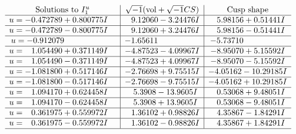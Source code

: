 \documentclass[1p]{elsarticle_modified}
\theoremstyle{definition}
\newcommand{\I}{\sqrt{-1}}
\begin{document}
$$\begin{array}{c|c|c}  
\text{Solutions to }I^u_{1}& \I (\text{vol} + \sqrt{-1}CS) & \text{Cusp shape}\\
 \hline 
\begin{aligned}
u &= -0.472789 + 0.800775 I\end{aligned}
 & \phantom{-}9.12060 - 3.24476 I & \phantom{-}5.98156 + 0.51441 I \\ \hline\begin{aligned}
u &= -0.472789 - 0.800775 I\end{aligned}
 & \phantom{-}9.12060 + 3.24476 I & \phantom{-}5.98156 - 0.51441 I \\ \hline\begin{aligned}
u &= -0.912079\phantom{ +0.000000I}\end{aligned}
 & -1.65611\phantom{ +0.000000I} & -5.73710\phantom{ +0.000000I} \\ \hline\begin{aligned}
u &= \phantom{-}1.054490 + 0.371149 I\end{aligned}
 & -4.87523 - 4.09967 I & -8.95070 + 5.15592 I \\ \hline\begin{aligned}
u &= \phantom{-}1.054490 - 0.371149 I\end{aligned}
 & -4.87523 + 4.09967 I & -8.95070 - 5.15592 I \\ \hline\begin{aligned}
u &= -1.081800 + 0.517146 I\end{aligned}
 & -2.76698 + 9.75515 I & -4.05162 - 10.29185 I \\ \hline\begin{aligned}
u &= -1.081800 - 0.517146 I\end{aligned}
 & -2.76698 - 9.75515 I & -4.05162 + 10.29185 I \\ \hline\begin{aligned}
u &= \phantom{-}1.094170 + 0.624458 I\end{aligned}
 & \phantom{-}5.3908 - 13.9605 I & \phantom{-}0.53068 + 9.48051 I \\ \hline\begin{aligned}
u &= \phantom{-}1.094170 - 0.624458 I\end{aligned}
 & \phantom{-}5.3908 + 13.9605 I & \phantom{-}0.53068 - 9.48051 I \\ \hline\begin{aligned}
u &= \phantom{-}0.361975 + 0.559972 I\end{aligned}
 & \phantom{-}1.36102 + 0.98826 I & \phantom{-}4.35867 - 1.84291 I \\ \hline\begin{aligned}
u &= \phantom{-}0.361975 - 0.559972 I\end{aligned}
 & \phantom{-}1.36102 - 0.98826 I & \phantom{-}4.35867 + 1.84291 I\\
 \hline 
 \end{array}$$\newpage\newpage\renewcommand{\arraystretch}{1}
\end{document}
